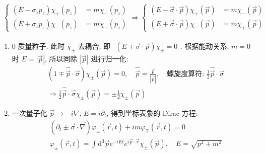 \documentclass[../../main.tex]{subfiles}
\begin{document}
\begin{align*}
    \left\{\begin{aligned}
        (E - \sigma_{z}p_{z})\chi_{+}(p_{z}) &= m\chi_{-}(p_{z})\\
        (E + \sigma_{z}p_{z})\chi_{-}(p_{z}) &= m\chi_{+}(p_{z})
    \end{aligned}\right.\Rightarrow \left\{\begin{aligned}
        (E - \vec{\sigma}\cdot\vec{p})\chi_{+}(\vec{p}) &= m\chi_{-}(\vec{p})\\
        (E + \vec{\sigma}\cdot\vec{p})\chi_{-}(\vec{p}) &= m\chi_{+}(\vec{p})
    \end{aligned}\right.
\end{align*}
\begin{enumerate}
    \item $0$ 质量粒子. 此时 $\chi_{\pm}$ 去耦合, 即 $\begin{aligned}
        \left(E \mp \vec{\sigma}\cdot\vec{p}\right)\chi_{\pm} = 0
    \end{aligned}$. 根据能动关系, $m=0$ 时 $E = |\vec{p}|$, 所以同除 $|\vec{p}|$ 进行归一化: 
    \begin{align*}
        &\left(1 \mp \hat{\vec{p}}\cdot \vec{\sigma}\right)\chi_{\pm}(\vec{p}) = 0,\quad \hat{\vec{p}} = \frac{\vec{p}}{|\vec{p}|},\quad \text{螺旋度算符: }\frac{1}{2}\hat{\vec{p}}\cdot \vec{\sigma}\\
        &\Rightarrow \frac{1}{2}\hat{\vec{p}}\cdot \vec{\sigma}\chi_{\pm}(\vec{p}) = \pm\frac{1}{2}\chi_{\pm}(\vec{p})
    \end{align*}
    \item 一次量子化 $\vec{p}\rightarrow -i\nabla$, $E = i\partial_{t}$, 得到坐标表象的 Dirac 方程:
    \begin{align*}
        &\left(\partial_{t} \pm\vec{\sigma}\cdot\vec{\nabla}\right)\varphi_{\pm}(\vec{r},t) + im\varphi_{\mp}(\vec{r},t) = 0\\
        &\varphi_{\pm}(\vec{r},t) = \int\mathrm{d}^{3}\vec{p} e^{-iEt}e^{i\vec{p}\cdot\vec{r}}\chi_{\pm}(\vec{p}),\quad E = \sqrt{p^{2} + m^{2}}
    \end{align*}


\end{enumerate}
\end{document}
